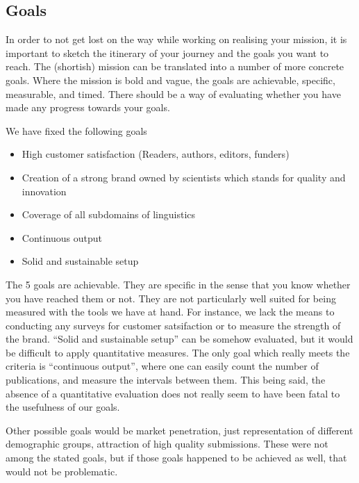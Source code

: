 \documentclass[nonflat,smallfont
]{langsci/langscibook}
\newcommand{\background}[1]{ 
  \vspace{5mm}
  \renewcommand{\tblslinecolour}{lsDarkBlue}
  \tblssy[red]{explore2}{Background}{\vspace*{-5mm}#1}
}
\newcommand{\langscisolution}[1]{
  \renewcommand{\tblslinecolour}{lsLightBlue}
  \tblssy{langsci}{LangSci solution}{\vspace*{-5mm}#1}
}
\newcommand{\evaluation}[1]{
  \renewcommand{\tblslinecolour}{lsLightOrange}
  \tblssy{receipt}{Evaluation}{\vspace*{-5mm}#1}
}
\newcommand{\othersolutions}[1]{
  \renewcommand{\tblslinecolour}{lsDarkGreenOne}
  \tblssy{more}{Other solutions}{\vspace*{-5mm}#1}
}
\renewcommand{\tblssy}[4][black!12]{%
  \renewcommand{\langscisymbol}{#2}\renewcommand{\tblsboxcolor}{#1}
  \begin{mdframed}[style=yellowexercise,frametitle={#3}]
    #4
  \end{mdframed}
}
\begin{document}
\subsection{Goals}
\vspace*{5mm}\background{In order to not get lost on the way while working on realising your mission, it is important to sketch the itinerary of your journey and the goals you want to reach. The (shortish) mission can be translated into a number of more concrete goals. Where the mission is bold and vague, the goals are achievable, specific, measurable, and timed. There should be a way of evaluating whether you have made any progress towards your goals.}
\langscisolution{
We have fixed the following goals
\begin{itemize}
\item High customer satisfaction (Readers, authors, editors, funders)
\item Creation of a strong brand owned by scientists which stands for quality and innovation
\item Coverage of all subdomains of linguistics
\item Continuous output
\item Solid and sustainable setup
\end{itemize} 
}
\evaluation{
The 5 goals are achievable. They are specific in the sense that you know whether you have reached them or not. They are not particularly well suited for being measured with the tools we have at hand. For instance,  we lack the means to conducting any surveys for customer satsifaction or to measure the strength of the brand. ``Solid and sustainable setup'' can be somehow evaluated, but it would be difficult to apply quantitative measures. The only goal which really meets the criteria is ``continuous output'', where one can easily count the number of publications, and measure the intervals between them. This being said, the absence of a quantitative evaluation does not really seem to have been fatal to the usefulness of our goals. 
}
\othersolutions{
Other possible goals would be market penetration, just representation of different demographic groups, attraction of high quality submissions. These were not among the stated goals, but if those goals happened to be achieved as well, that would not  be problematic.
} 

\newpage 
\end{document}
